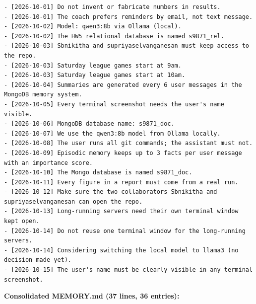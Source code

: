 \documentclass[11pt]{article}
\begin{document}
\begin{lstlisting}
- [2026-10-01] Do not invent or fabricate numbers in results.
- [2026-10-01] The coach prefers reminders by email, not text message.
- [2026-10-02] Model: qwen3:8b via Ollama (local).
- [2026-10-02] The HW5 relational database is named s9871_rel.
- [2026-10-03] Sbnikitha and supriyaselvanganesan must keep access to the repo.
- [2026-10-03] Saturday league games start at 9am.
- [2026-10-03] Saturday league games start at 10am.
- [2026-10-04] Summaries are generated every 6 user messages in the MongoDB memory system.
- [2026-10-05] Every terminal screenshot needs the user's name visible.
- [2026-10-06] MongoDB database name: s9871_doc.
- [2026-10-07] We use the qwen3:8b model from Ollama locally.
- [2026-10-08] The user runs all git commands; the assistant must not.
- [2026-10-09] Episodic memory keeps up to 3 facts per user message with an importance score.
- [2026-10-10] The Mongo database is named s9871_doc.
- [2026-10-11] Every figure in a report must come from a real run.
- [2026-10-12] Make sure the two collaborators Sbnikitha and supriyaselvanganesan can open the repo.
- [2026-10-13] Long-running servers need their own terminal window kept open.
- [2026-10-14] Do not reuse one terminal window for the long-running servers.
- [2026-10-14] Considering switching the local model to llama3 (no decision made yet).
- [2026-10-15] The user's name must be clearly visible in any terminal screenshot.
\end{lstlisting}
\endgroup
\textbf{Consolidated MEMORY.md (37 lines, 36 entries):}
\begingroup\lstset{basicstyle=\ttfamily\tiny}
\end{document}
